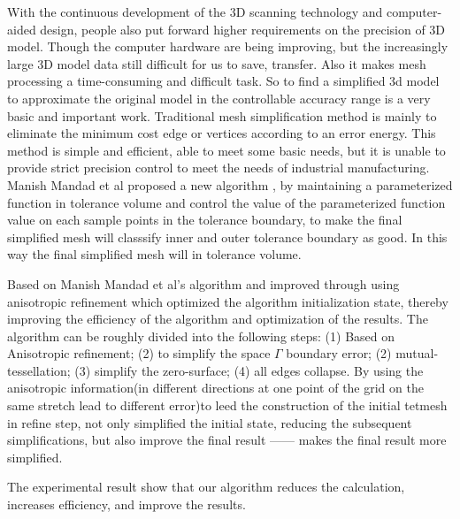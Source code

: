 

\begin{eabstract}
With the continuous development of the 3D scanning technology and computer-aided design, people also put forward higher requirements on the precision of 3D model. Though the computer hardware are being improving, but the increasingly large 3D model data still difficult for us to save, transfer. Also it makes mesh processing a time-consuming and difficult task.
So to find a simplified 3d model to approximate the original model in the controllable accuracy range is a very basic and important work. Traditional mesh simplification method is mainly to eliminate the minimum cost edge or vertices according to an error energy. This method is simple and efficient, able to meet some basic needs, but it is unable to provide strict precision control to meet the needs of industrial manufacturing. Manish Mandad et al proposed a new algorithm \cite{isotopic-appro}, by maintaining a parameterized function in tolerance volume and control the value of the parameterized function value on each sample points in the tolerance boundary, to make the final simplified mesh will classsify inner and outer tolerance boundary as good. In this way the final simplified mesh will in tolerance volume.\par

Based on Manish Mandad et al's algorithm \cite{isotopic-appro} and improved through using anisotropic refinement which optimized the algorithm initialization state, thereby improving the efficiency of the algorithm and optimization of the results. The algorithm can be roughly divided into the following steps: (1) Based on Anisotropic refinement; (2) to simplify the space $\Gamma$ boundary error; (2) mutual-tessellation; (3) simplify the zero-surface; (4) all edges collapse. By using the anisotropic information(in different directions at one point of the grid on the same stretch lead to different error)to leed the construction of the initial tetmesh in refine step, not only simplified the initial state, reducing the subsequent simplifications, but also improve the final result —— makes the final result more simplified.\par
The experimental result show that our algorithm reduces the calculation, increases efficiency, and improve the results.
\end{eabstract}

